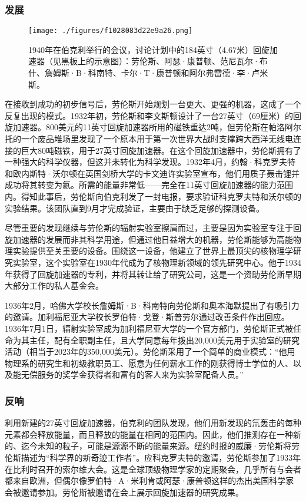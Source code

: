 \subsubsection{发展}
\begin{figure}[ht]
\centering
\texttt{[image: ./figures/f1028083d22e9a26.png]}
\caption{1940年在伯克利举行的会议，讨论计划中的184英寸（4.67米）回旋加速器（见黑板上的示意图）：劳伦斯、阿瑟·康普顿、范尼瓦尔·布什、詹姆斯·B·科南特、卡尔·T·康普顿和阿尔弗雷德·李·卢米斯。} \label{fig_ONST_2}
\end{figure}
在接收到成功的初步信号后，劳伦斯开始规划一台更大、更强的机器，这成了一个反复出现的模式。1932年初，劳伦斯和李文斯顿设计了一台27英寸（69厘米）的回旋加速器。800美元的11英寸回旋加速器所用的磁铁重达2吨，但劳伦斯在帕洛阿尔托的一个废品堆场里发现了一个原本用于第一次世界大战时支撑跨大西洋无线电连接的巨大80吨磁铁，用于27英寸回旋加速器。在这个回旋加速器中，劳伦斯拥有了一种强大的科学仪器，但这并未转化为科学发现。1932年4月，约翰·科克罗夫特和欧内斯特·沃尔顿在英国剑桥大学的卡文迪许实验室宣布，他们用质子轰击锂并成功将其转变为氦。所需的能量非常低——完全在11英寸回旋加速器的能力范围内。得知此事后，劳伦斯向伯克利发了一封电报，要求验证科克罗夫特和沃尔顿的实验结果。该团队直到9月才完成验证，主要由于缺乏足够的探测设备。

尽管重要的发现继续与劳伦斯的辐射实验室擦肩而过，主要是因为实验室专注于回旋加速器的发展而非其科学用途，但通过他日益增大的机器，劳伦斯能够为高能物理实验提供至关重要的设备。围绕这一设备，他建立了世界上最顶尖的核物理学研究实验室，这个实验室在1930年代成为了核物理新领域的领先研究中心。他于1934年获得了回旋加速器的专利，并将其转让给了研究公司，这是一个资助劳伦斯早期大部分工作的私人基金会。

1936年2月，哈佛大学校长詹姆斯·B·科南特向劳伦斯和奥本海默提出了有吸引力的邀请。加利福尼亚大学校长罗伯特·戈登·斯普劳尔通过改善条件作出回应。1936年7月1日，辐射实验室成为加利福尼亚大学的一个官方部门，劳伦斯正式被任命为其主任，配有全职副主任，且大学同意每年拨出20,000美元用于实验室的研究活动（相当于2023年的350,000美元）。劳伦斯采用了一个简单的商业模式：“他用物理系的研究生和初级教职员工、愿意为任何薪水工作的刚获得博士学位的人、以及能无偿服务的奖学金获得者和富有的客人来为实验室配备人员。”
\subsubsection{反响}
利用新建的27英寸回旋加速器，伯克利的团队发现，他们用新发现的氘轰击的每种元素都会释放能量，而且释放的能量在相同的范围内。因此，他们推测存在一种新的、迄今未知的粒子，可能是源源不断的能量来源。纽约时报的威廉·劳伦斯将劳伦斯描述为“科学界的新奇迹工作者”。应科克罗夫特的邀请，劳伦斯参加了1933年在比利时召开的索尔维大会。这是全球顶级物理学家的定期聚会，几乎所有与会者都来自欧洲，但偶尔像罗伯特·A·米利肯或阿瑟·康普顿这样的杰出美国科学家会被邀请参加。劳伦斯被邀请在会上展示回旋加速器的研究成果。

